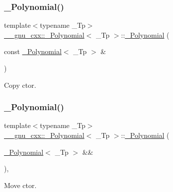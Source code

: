 \subsubsection{\texorpdfstring{\+\_\+\+Polynomial()}{\_Polynomial()}\hspace{0.1cm}{\footnotesize\ttfamily [2/9]}}
{\footnotesize\ttfamily template$<$typename \+\_\+\+Tp$>$ \\
\hyperlink{class____gnu__cxx_1_1__Polynomial}{\+\_\+\+\_\+gnu\+\_\+cxx\+::\+\_\+\+Polynomial}$<$ \+\_\+\+Tp $>$\+::\hyperlink{class____gnu__cxx_1_1__Polynomial}{\+\_\+\+Polynomial} (\begin{DoxyParamCaption}\item[{const \hyperlink{class____gnu__cxx_1_1__Polynomial}{\+\_\+\+Polynomial}$<$ \+\_\+\+Tp $>$ \&}]{ }\end{DoxyParamCaption})\hspace{0.3cm}{\ttfamily [default]}}

Copy ctor. \mbox{\label{class____gnu__cxx_1_1__Polynomial_a87bad90934c9752b51cdece15a5b369f}} 
\subsubsection{\texorpdfstring{\+\_\+\+Polynomial()}{\_Polynomial()}\hspace{0.1cm}{\footnotesize\ttfamily [3/9]}}
{\footnotesize\ttfamily template$<$typename \+\_\+\+Tp$>$ \\
\hyperlink{class____gnu__cxx_1_1__Polynomial}{\+\_\+\+\_\+gnu\+\_\+cxx\+::\+\_\+\+Polynomial}$<$ \+\_\+\+Tp $>$\+::\hyperlink{class____gnu__cxx_1_1__Polynomial}{\+\_\+\+Polynomial} (\begin{DoxyParamCaption}\item[{\hyperlink{class____gnu__cxx_1_1__Polynomial}{\+\_\+\+Polynomial}$<$ \+\_\+\+Tp $>$ \&\&}]{ }\end{DoxyParamCaption})\hspace{0.3cm}{\ttfamily [default]}, {\ttfamily [noexcept]}}

Move ctor. \mbox{\label{class____gnu__cxx_1_1__Polynomial_ae744374b972b91a9609ba6cc1330bbfd}} 
